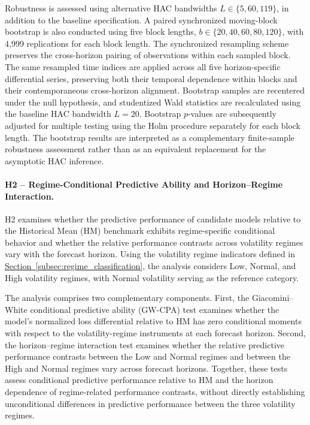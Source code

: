 \documentclass[runningheads,orivec]{llncs}
\begin{document}
Robustness is assessed using alternative HAC bandwidths $L\in\{5,60,119\}$, in addition to the baseline specification. A paired synchronized moving-block bootstrap is also conducted using five block lengths, $b\in\{20,40,60,80,120\}$, with 4,999 replications for each block length. The synchronized resampling scheme preserves the cross-horizon pairing of observations within each sampled block. The same resampled time indices are applied across all five horizon-specific differential series, preserving both their temporal dependence within blocks and their contemporaneous cross-horizon alignment. Bootstrap samples are recentered under the null hypothesis, and studentized Wald statistics are recalculated using the baseline HAC bandwidth $L=20$. Bootstrap $p$-values are subsequently adjusted for multiple testing using the Holm procedure separately for each block length. The bootstrap results are interpreted as a complementary finite-sample robustness assessment rather than as an equivalent replacement for the asymptotic HAC inference.

\paragraph{H2 -- Regime-Conditional Predictive Ability and Horizon--Regime Interaction.} H2 examines whether the predictive performance of candidate models relative to the Historical Mean (HM) benchmark exhibits regime-specific conditional behavior and whether the relative performance contrasts across volatility regimes vary with the forecast horizon. Using the volatility regime indicators defined in \hyperref[subsec:regime_classification]{Section~\ref*{subsec:regime_classification}}, the analysis considers Low, Normal, and High volatility regimes, with Normal volatility serving as the reference category.

The analysis comprises two complementary components. First, the Giacomini--White conditional predictive ability (GW-CPA) test examines whether the model's normalized loss differential relative to HM has zero conditional moments with respect to the volatility-regime instruments at each forecast horizon. Second, the horizon--regime interaction test examines whether the relative predictive performance contrasts between the Low and Normal regimes and between the High and Normal regimes vary across forecast horizons. Together, these tests assess conditional predictive performance relative to HM and the horizon dependence of regime-related performance contrasts, without directly establishing unconditional differences in predictive performance between the three volatility regimes.
\end{document}
